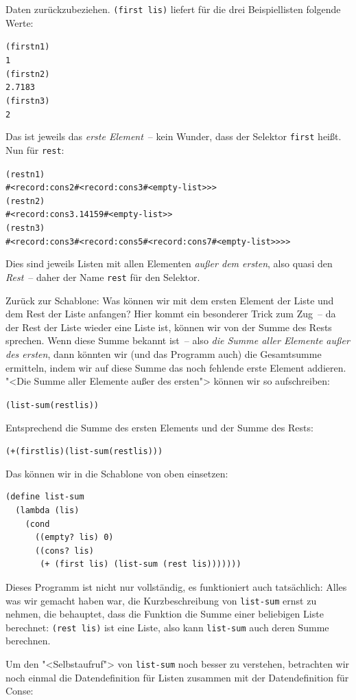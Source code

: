 Daten zurückzubeziehen.  \texttt{(first lis)} liefert für die drei
Beispiellisten folgende Werte:
%
\begin{alltt}
(first n1)
\evalsto{} 1
(first n2)
\evalsto{} 2.7183
(first n3)
\evalsto{} 2
\end{alltt}
%
Das ist jeweils das \emph{erste Element}~-- kein Wunder, dass der
Selektor \texttt{first} heißt.  Nun für \texttt{rest}:
%
\begin{alltt}
(rest n1)
\evalsto{} #<record:cons 2 #<record:cons 3 #<empty-list>>>
(rest n2)
\evalsto{}  #<record:cons 3.14159 #<empty-list>>
(rest n3)
\evalsto{} #<record:cons 3 #<record:cons 5 #<record:cons 7 #<empty-list>>>>
\end{alltt}
%
Dies sind jeweils Listen mit allen Elementen \emph{außer dem
  ersten}, also quasi den \emph{Rest}~-- daher der Name \texttt{rest}
für den Selektor.

Zurück zur Schablone: Was können wir mit dem ersten Element der Liste
und dem Rest der Liste anfangen?  Hier kommt ein besonderer Trick zum
Zug~-- da der Rest der Liste wieder eine Liste ist, können
wir von der Summe des Rests sprechen.  Wenn diese Summe bekannt
ist~-- also \emph{die Summe aller Elemente außer des ersten}, dann
könnten wir (und das Programm auch) die Gesamtsumme ermitteln, indem wir
auf diese Summe das noch fehlende erste Element addieren.  "<Die Summe
aller Elemente außer des ersten"> können wir so aufschreiben:
%
\begin{alltt}
(list-sum (rest lis))
\end{alltt}
%
Entsprechend die Summe des ersten Elements und der Summe des Rests:
%
\begin{alltt}
(+ (first lis) (list-sum (rest lis)))
\end{alltt}
%
Das können wir in die Schablone von oben einsetzen:
%
\begin{verbatim}
(define list-sum
  (lambda (lis)
    (cond
      ((empty? lis) 0)
      ((cons? lis)
       (+ (first lis) (list-sum (rest lis)))))))
\end{verbatim}
%
Dieses Programm ist nicht nur vollständig, es funktioniert auch
tatsächlich: Alles was wir gemacht haben war, die Kurzbeschreibung
von \texttt{list-sum} ernst zu nehmen, die behauptet, dass die Funktion
die Summe einer beliebigen Liste berechnet: \texttt{(rest lis)} ist
eine Liste, also kann \texttt{list-sum} auch deren Summe berechnen.

Um den "<Selbstaufruf"> von \texttt{list-sum} noch besser zu
verstehen, betrachten wir noch einmal die Datendefinition für
Listen zusammen mit der Datendefinition für Conse:

